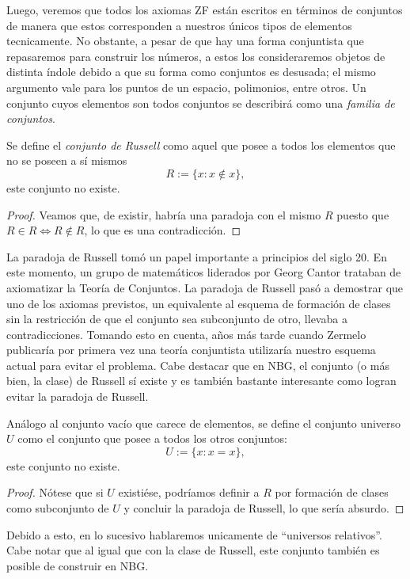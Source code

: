 \documentclass[11pt,a4paper]{book}
\begin{document}
Luego, veremos que todos los axiomas ZF están escritos en términos de conjuntos de manera que estos corresponden a nuestros únicos tipos de elementos tecnicamente. No obstante, a pesar de que hay una forma conjuntista que repasaremos para construir los números, a estos los consideraremos objetos de distinta índole debido a que su forma como conjuntos es desusada; el mismo argumento vale para los puntos de un espacio, polimonios, entre otros. Un conjunto cuyos elementos son todos conjuntos se describirá como una \textit{familia de conjuntos}.
\begin{thm}
	Se define el \textit{conjunto de Russell} como aquel que posee a todos los elementos que no se poseen a sí mismos
	$$R:=\{x:x\notin x\},$$
	este conjunto no existe.
\end{thm}
\begin{proof}
Veamos que, de existir, habría una paradoja con el mismo $R$ puesto que $R\in R\iff R\notin R$, lo que es una contradicción.
\end{proof}
La paradoja de Russell tomó un papel importante a principios del siglo 20. En este momento, un grupo de matemáticos liderados por Georg Cantor trataban de axiomatizar la Teoría de Conjuntos. La paradoja de Russell pasó a demostrar que uno de los axiomas previstos, un equivalente al esquema de formación de clases sin la restricción de que el conjunto sea subconjunto de otro, llevaba a contradicciones. Tomando esto en cuenta, años más tarde cuando Zermelo publicaría por primera vez una teoría conjuntista utilizaría nuestro esquema actual para evitar el problema. Cabe destacar que en NBG, el conjunto (o más bien, la clase) de Russell sí existe y es también bastante interesante como logran evitar la paradoja de Russell.
\begin{thm}
	Análogo al conjunto vacío que carece de elementos, se define el conjunto universo $U$ como el conjunto que posee a todos los otros conjuntos:
	$$U:=\{x:x=x\},$$
	este conjunto no existe.
\end{thm}
\begin{proof}
Nótese que si $U$ existiése, podríamos definir a $R$ por formación de clases como subconjunto de $U$ y concluir la paradoja de Russell, lo que sería absurdo.
\end{proof}
Debido a esto, en lo sucesivo hablaremos unicamente de ``universos relativos''. Cabe notar que al igual que con la clase de Russell, este conjunto también es posible de construir en NBG.
\end{document}
